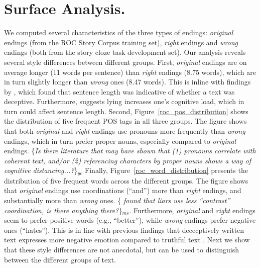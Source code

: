 \documentclass[11pt,a4paper]{article}
\newcommand{\figref}[1]{Figure~\ref{#1}}
\newcommand{\isection}[2]{\section{#1}\label{ssec:#2}}
\newcommand{\ms}[1]{{\color{cyan}\{\textit{#1}\}$_{ms}$}}
\newcommand{\yc}[1]{{\color{bblue}\{\textit{#1}\}$_{yc}$}}
\newcommand{\nascomment}[1]{{\color{blue}\textsc{[#1 --nas]}}}
\begin{document}
\isection{Surface Analysis.}{Surface}
We computed several characteristics of the three types of endings: {\it original} endings (from the ROC Story Corpus training set), {\it right} endings and {\it wrong} endings (both from the story cloze task development set).
Our analysis  reveals several style differences between different groups. 
First, {\it original} endings are on average longer (11 words per
sentence) than {\it right} endings (8.75 words), which are in turn
slightly longer than {\it wrong} ones (8.47 words). This is inline with findings by \citet{yanchevaautomatic,qin2004exploratory}, which found that sentence length was indicative of whether a text was deceptive. Furthermore, \citet{buller1996interpersonal} suggests lying increases one's cognitive load, which in turn could affect sentence length.
Second, \figref{roc_pos_distribution} shows the distribution of five frequent POS tags in all three groups. 
The figure shows that both {\it original} and {\it right} endings use pronouns more frequently than {\it wrong} endings,
which in turn prefer proper nouns, especially compared to {\it original} endings. 
\yc{Is there literature that may have shown that (1) pronouns correlate with coherent text, and/or (2) referencing characters by proper nouns shows a way of cognitive distancing...?}
Finally, \figref{roc_word_distribution} presents the distribution of five frequent words across the different groups. 
The figure shows that {\it original} endings use coordinations (``and'') more than  {\it right} endings, and substantially more than {\it wrong} ones. \ms{\cite{Newman:2003} found that liars use less ``contrast'' coordination, is there anything there?}.
Furthermore, {\it original} and {\it right} endings seem to prefer positive words (e.g., ``better''), while {\it wrong} endings prefer negative ones (``hates''). This is in line with previous findings that dececptively written text expresses more negative emotion compared to truthful text \cite{Newman:2003}.
Next we show that these style differences are not anecdotal, but can be used to distinguish between the different groups of text.
\end{document}
